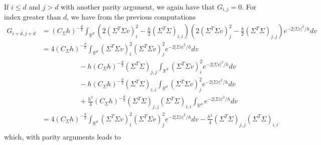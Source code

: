 \documentclass[12pt]{amsart}
\newcommand{\R}{\mathbb R}
\numberwithin{equation}{section}
\numberwithin{figure}{section}
\begin{document}
If $i\leq d$ and $j>d$ with another parity argument, we again have that $G_{i,j} = 0$. For index greater than $d$, we have from the previous %
computations
\begin{equation*}
\begin{aligned}
    G_{i+d,j+d} &= (C_\Sigma h)^{-\frac d2}\int_{\R^d}(2(\Sigma^T\Sigma v)_i^2 - \frac h2(\Sigma^T\Sigma)_{i,i})(2(\Sigma^T\Sigma v)_j^2 - \frac h2(\Sigma^T\Sigma)_{j,j})e^{-2|\Sigma v|^2/h}dv\\
    &= 4(C_\Sigma h)^{-\frac d2}\int_{\R^d}(\Sigma^T\Sigma v)_i^2(\Sigma^T\Sigma v)_j^2e^{-2|\Sigma v|^2/h}dv\\
    &\phantom{********} - h(C_\Sigma h)^{-\frac d2}(\Sigma^T\Sigma)_{j,j}\int_{\R^d}(\Sigma^T\Sigma v)_i^2e^{-2|\Sigma v|^2/h}dv\\
    &\phantom{********} - h(C_\Sigma h)^{-\frac d2}(\Sigma^T\Sigma)_{i,i}\int_{\R^d}(\Sigma^T\Sigma v)_j^2e^{-2|\Sigma v|^2/h}dv\\
    &\phantom{********} + \frac{h^2}{4}(C_\Sigma h)^{-\frac d2}(\Sigma^T\Sigma)_{j,j}(\Sigma^T\Sigma)_{i,i}\int_{\R^d}e^{-2|\Sigma v|^2/h}dv\\
    &= 4(C_\Sigma h)^{-\frac d2}\int_{\R^d}(\Sigma^T\Sigma v)_i^2(\Sigma^T\Sigma v)_j^2e^{-2|\Sigma v|^2/h}dv - \frac{h^2}{4}(\Sigma^T\Sigma)_{j,j}(\Sigma^T\Sigma)_{i,i}\\
\end{aligned}
\end{equation*}
which, %
with parity arguments leads %
to 
\end{document}
